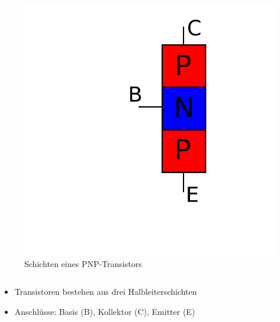 \begin{frame}
\begin{columns}
\begin{figure}
      \includegraphics[width=\textwidth,height=.5\textheight,keepaspectratio]{a06/PNP_hlb.png}
      \caption{Schichten eines PNP-Transistors}
    \end{figure}
  \end{columns}
  \begin{center}
    \begin{itemize}
      \item Transistoren bestehen aus drei Halbleiterschichten
      \item Anschlüsse: Basis (B), Kollektor (C), Emitter (E)
    \end{itemize}
  \end{center}
\end{frame}

